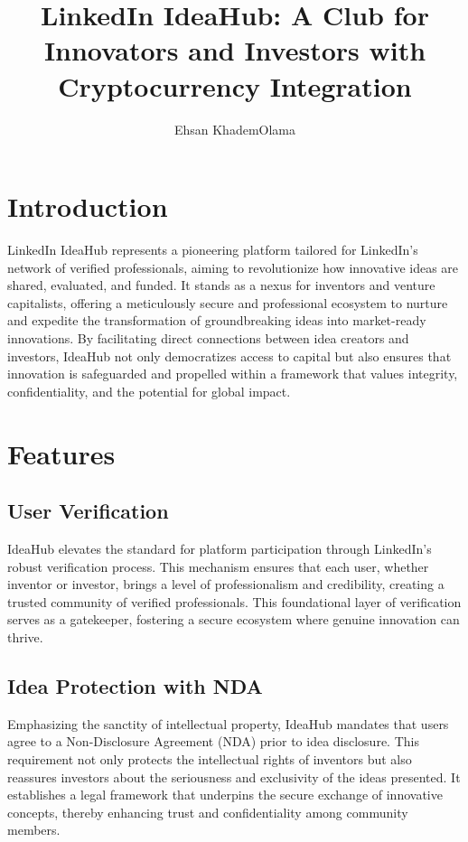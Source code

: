 \documentclass{article}
\title{LinkedIn IdeaHub: A Club for Innovators and Investors with Cryptocurrency Integration}
\author{Ehsan KhademOlama }
\begin{document}
	\maketitle
	\tableofcontents
	\newpage
	
	\section{Introduction}
	LinkedIn IdeaHub represents a pioneering platform tailored for LinkedIn's network of verified professionals, aiming to revolutionize how innovative ideas are shared, evaluated, and funded. It stands as a nexus for inventors and venture capitalists, offering a meticulously secure and professional ecosystem to nurture and expedite the transformation of groundbreaking ideas into market-ready innovations. By facilitating direct connections between idea creators and investors, IdeaHub not only democratizes access to capital but also ensures that innovation is safeguarded and propelled within a framework that values integrity, confidentiality, and the potential for global impact.
	
	\section{Features}
	\subsection{User Verification}
	IdeaHub elevates the standard for platform participation through LinkedIn's robust verification process. This mechanism ensures that each user, whether inventor or investor, brings a level of professionalism and credibility, creating a trusted community of verified professionals. This foundational layer of verification serves as a gatekeeper, fostering a secure ecosystem where genuine innovation can thrive.
	
	\subsection{Idea Protection with NDA}
	Emphasizing the sanctity of intellectual property, IdeaHub mandates that users agree to a Non-Disclosure Agreement (NDA) prior to idea disclosure. This requirement not only protects the intellectual rights of inventors but also reassures investors about the seriousness and exclusivity of the ideas presented. It establishes a legal framework that underpins the secure exchange of innovative concepts, thereby enhancing trust and confidentiality among community members.
	
\end{document}
